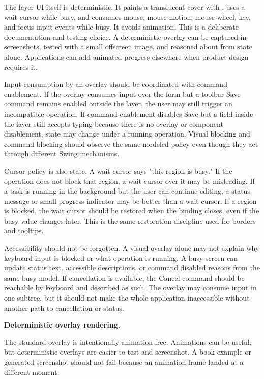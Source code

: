 The layer UI itself is deterministic. It paints a translucent cover with
, uses a wait cursor while busy, and consumes mouse,
mouse-motion, mouse-wheel, key, and focus input events while busy. It avoids
animation. This is a deliberate documentation and testing choice. A deterministic
overlay can be captured in screenshots, tested with a small offscreen
image, and reasoned about from state alone. Applications can add animated
progress elsewhere when product design requires it.

Input consumption by an overlay should be coordinated with command enablement.
If the overlay consumes input over the form but a toolbar Save command remains
enabled outside the layer, the user may still trigger an incompatible operation.
If command enablement disables Save but a field inside the layer still accepts
typing because there is no overlay or component disablement, state may change
under a running operation. Visual blocking and command blocking should observe
the same modeled policy even though they act through different Swing
mechanisms.

Cursor policy is also state. A wait cursor says "this region is busy." If the
operation does not block that region, a wait cursor over it may be misleading.
If a task is running in the background but the user can continue editing, a
status message or small progress indicator may be better than a wait cursor.
If a region is blocked, the wait cursor should be restored when the binding
closes, even if the busy value changes later. This is the same restoration
discipline used for borders and tooltips.

Accessibility should not be forgotten. A visual overlay alone may not explain
why keyboard input is blocked or what operation is running. A busy screen can
update status text, accessible descriptions, or command disabled reasons from
the same busy model. If cancellation is available, the Cancel command should be
reachable by keyboard and described as such. The overlay may consume input in
one subtree, but it should not make the whole application inaccessible without
another path to cancellation or status.

\textbf{Deterministic overlay rendering.}

The standard overlay is intentionally animation-free. Animations can be useful,
but deterministic overlays are easier to test and screenshot. A book example or
generated screenshot should not fail because an animation frame landed at a
different moment.

